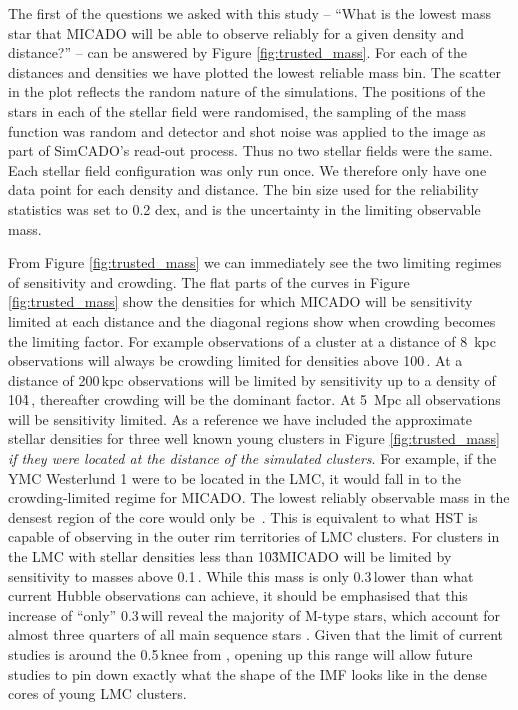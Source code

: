 The first of the questions we asked with this study -- ``What is the lowest mass star that MICADO will be able to observe reliably for a given density and distance?'' -- can be answered by Figure \ref{fig:trusted_mass}. 
For each of the distances and densities we have plotted the lowest reliable mass bin. 
The scatter in the plot reflects the random nature of the simulations. 
The positions of the stars in each of the stellar field were randomised, the sampling of the mass function was random and detector and shot noise was applied to the image as part of SimCADO's read-out process. 
Thus no two stellar fields were the same. 
Each stellar field configuration was only run once. 
We therefore only have one data point for each density and distance. 
The bin size used for the reliability statistics was set to 0.2 dex, and is the uncertainty in the limiting observable mass.

From Figure \ref{fig:trusted_mass} we can immediately see the two limiting regimes of sensitivity and crowding. 
The flat parts of the curves in Figure \ref{fig:trusted_mass} show the densities for which MICADO will be sensitivity limited at each distance and the diagonal regions show when crowding becomes the limiting factor. 
For example observations of a cluster at a distance of 8\, kpc observations will always be crowding limited for densities above 100\,\spae.
At a distance of 200\,kpc observations will be limited by sensitivity up to a density of 10\h4\,\spa, thereafter crowding will be the dominant factor. 
At 5\, Mpc all observations will be sensitivity limited. 
As a reference we have included the approximate stellar densities for three well known young  clusters in Figure \ref{fig:trusted_mass} \textit{if they were located at the distance of the simulated clusters}. 
For example, if the YMC Westerlund 1 were to be located in the LMC, it would fall in to the crowding-limited regime for MICADO.
The lowest reliably observable mass in the densest region of the core would only be \,\msun. 
This is equivalent to what HST is capable of observing in the outer rim territories of LMC clusters. For clusters in the LMC with stellar densities less than 10\h3\spa MICADO will be limited by sensitivity to masses above 0.1\,\msun. 
While this mass is only 0.3\,\msun lower than what current Hubble observations can achieve, it should be emphasised that this increase of ``only'' 0.3\,\msun will reveal the majority of M-type stars, which account for almost three quarters of all main sequence stars \citep{ledrew2001}. 
Given that the limit of current studies is around the 0.5\,\msun knee from \citet{kroupa2001}, opening up this range will allow future studies to pin down exactly what the shape of the IMF looks like in the dense cores of young LMC clusters.

